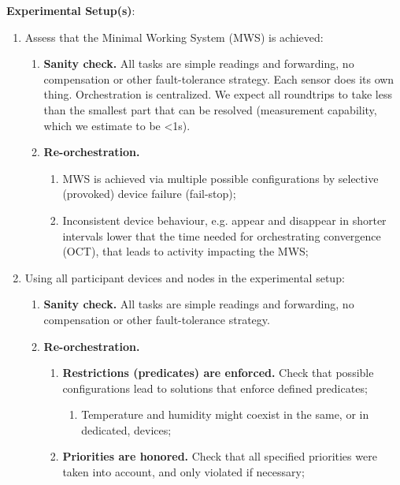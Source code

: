 \textbf{Experimental Setup(s)}:
\begin{enumerate}
    \item Assess that the Minimal Working System (MWS) is achieved:
        \begin{enumerate}
            \item \textbf{Sanity check.} All tasks are simple readings and forwarding, no compensation or other fault-tolerance strategy. Each sensor does its own thing. Orchestration is centralized. We expect all roundtrips to take less than the smallest part that can be resolved (measurement capability, which we estimate to be <1s).
            \item \textbf{Re-orchestration.}
                \begin{enumerate}
                    \item MWS is achieved via multiple possible configurations by selective (provoked) device failure (fail-stop);
                    \item Inconsistent device behaviour, e.g. appear and disappear in shorter intervals lower that the time needed for orchestrating convergence (OCT), that leads to activity impacting the MWS;
                \end{enumerate}
        \end{enumerate}
    \item Using all participant devices and nodes in the experimental setup:
        \begin{enumerate}
            \item \textbf{Sanity check.} All tasks are simple readings and forwarding, no compensation or other fault-tolerance strategy.
            \item \textbf{Re-orchestration.}
                \begin{enumerate}
                    \item \textbf{Restrictions (predicates) are enforced.} Check that possible configurations lead to solutions that enforce defined predicates;
                        \begin{enumerate}
                            \item Temperature and humidity might coexist in the same, or in dedicated, devices;
                        \end{enumerate}
                    \item \textbf{Priorities are honored.} Check that all specified priorities were taken into account, and only violated if necessary;
                        \begin{enumerate}

\end{enumerate}
\end{enumerate}
\end{enumerate}
\end{enumerate}

